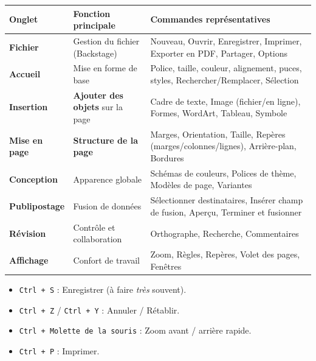 \documentclass[11pt]{article}
\begin{document}
\begin{exemplebox}
\begin{center}
\begin{tabularx}{\linewidth}{|l|X|X|}
\hline
\rowcolor{popblueL}
\textbf{Onglet} & \textbf{Fonction principale} & \textbf{Commandes représentatives} \\
\hline
\textbf{Fichier} & Gestion du fichier (Backstage) & Nouveau, Ouvrir, Enregistrer, Imprimer, Exporter en PDF, Partager, Options \\
\hline
\textbf{Accueil} & Mise en forme de base & Police, taille, couleur, alignement, puces, styles, Rechercher/Remplacer, Sélection \\
\hline
\textbf{Insertion} & \textbf{Ajouter des objets} sur la page & Cadre de texte, Image (fichier/en ligne), Formes, WordArt, Tableau, Symbole \\
\hline
\textbf{Mise en page} & \textbf{Structure de la page} & Marges, Orientation, Taille, Repères (marges/colonnes/lignes), Arrière-plan, Bordures \\
\hline
\textbf{Conception} & Apparence globale & Schémas de couleurs, Polices de thème, Modèles de page, Variantes \\
\hline
\textbf{Publipostage} & Fusion de données & Sélectionner destinataires, Insérer champ de fusion, Aperçu, Terminer et fusionner \\
\hline
\textbf{Révision} & Contrôle et collaboration & Orthographe, Recherche, Commentaires \\
\hline
\textbf{Affichage} & Confort de travail & Zoom, Règles, Repères, Volet des pages, Fenêtres \\
\hline
\end{tabularx}
\end{center}
\end{exemplebox}

\begin{aretenir}
\begin{itemize}
    \item \texttt{Ctrl + S} : Enregistrer (à faire \emph{très} souvent).
    \item \texttt{Ctrl + Z} / \texttt{Ctrl + Y} : Annuler / Rétablir.
    \item \texttt{Ctrl + Molette de la souris} : Zoom avant / arrière rapide.
    \item \texttt{Ctrl + P} : Imprimer.
\end{itemize}
\end{aretenir}
\end{document}
